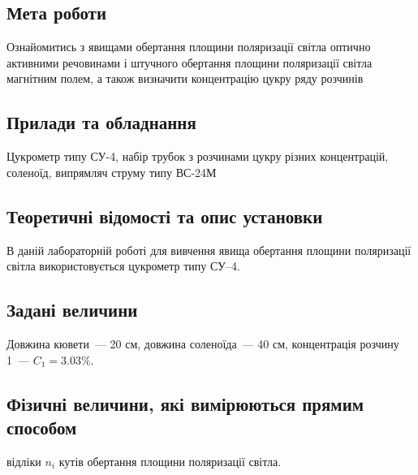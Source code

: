 \documentclass[12pt]{article}
\begin{document}

{\fontsize{14}{16.2}\selectfont

\subsection*{Мета роботи}
Ознайомитись з явищами обертання площини поляризації світла оптично
активними речовинами і штучного обертання площини поляризації світла
магнітним полем, а також визначити концентрацію цукру ряду розчинів

\subsection*{Прилади та обладнання}
Цукрометр типу СУ-4, набір трубок з розчинами цукру різних
концентрацій, соленоїд, випрямляч струму типу ВС-24М

\subsection*{Теоретичні відомості та опис установки}
В даній лабораторній роботі для вивчення явища обертання площини
поляризації світла використовується цукрометр типу СУ–4.

\subsection*{Задані величини}
Довжина кювети~--- 20 см, довжина соленоїда~--- 40 см, концентрація
розчину 1~--- $C_1=3.03\%.$

\subsection*{Фізичні величини, які вимірюються прямим способом}
відліки $n_i$ кутів обертання площини поляризації світла.

\subsection*{}

}
\end{document}
